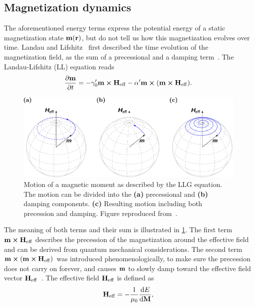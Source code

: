 \documentclass[11pt,a4paper,english]{article}
\begin{document}
\subsection{Magnetization dynamics}
The aforementioned energy terms express the potential energy of a static magnetization state $\vb{m}(\vb{r})$, but do not tell us how this magnetization evolves over time. Landau and Lifshitz~\cite{lifdau} first described the time evolution of the magnetization field, as the sum of a precessional and a damping term~\cite{abert2013discrete, NML_Carlton, phd_leliaert}. The Landau-Lifshitz (LL) equation reads
\begin{equation}
    \frac{\partial \vb{m}}{\partial t} = - \gamma_0' \vb{m} \cross \vb{H_\mathrm{eff}} - \alpha' \vb{m} \cross (\vb{m} \cross \vb{H_\mathrm{eff}}) \mathrm{.}
    \label{eq:LL}
\end{equation}
\begin{figure}
    \centering
    \includegraphics[width=0.8\columnwidth]{Figures/Introduction/abert2013discrete - Figure 2.2.pdf}
    \caption{Motion of a magnetic moment as described by the LLG equation. The motion can be divided into the \textbf{(a)} precessional and \textbf{(b)} damping components. \textbf{(c)} Resulting motion including both precession and damping. Figure reproduced from~\cite{abert2013discrete}.}
    \label{fig:LLG_motion_Heff}
\end{figure}
\par The meaning of both terms and their sum is illustrated in \cref{fig:LLG_motion_Heff}. The first term $\vb{m} \cross \vb{H_\mathrm{eff}}$ describes the precession of the magnetization around the effective field and can be derived from quantum mechanical considerations. The second term $\vb{m} \cross (\vb{m} \cross \vb{H_\mathrm{eff}})$ was introduced phenomenologically, to make sure the precession does not carry on forever, and causes $\vb{m}$ to slowly damp toward the effective field vector $\vb{H_\mathrm{eff}}$~\cite{NML_Carlton}. The effective field $\vb{H_\mathrm{eff}}$ is defined as
\begin{equation}
	\vb{H_\mathrm{eff}} = - \frac{1}{\mu_0} \frac{\mathrm{d} E}{\mathrm{d} \vb{M}} \mathrm{,}
	\label{eq:H_eff}
\end{equation}
\end{document}
